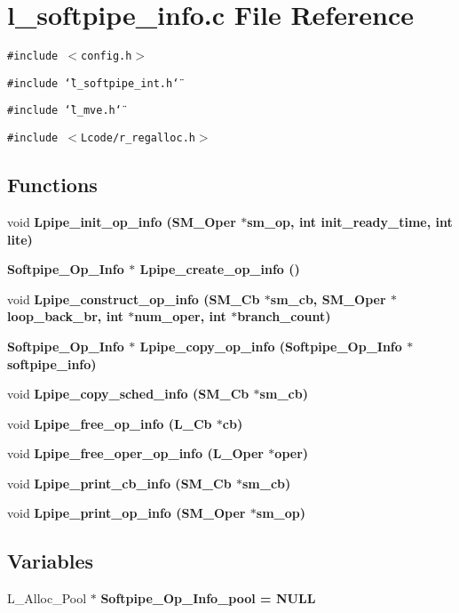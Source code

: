 \section{l\_\-softpipe\_\-info.c File Reference}
\label{l__softpipe__info_8c}
{\tt \#include $<$config.h$>$}\par
{\tt \#include \char`\"{}l\_\-softpipe\_\-int.h\char`\"{}}\par
{\tt \#include \char`\"{}l\_\-mve.h\char`\"{}}\par
{\tt \#include $<$Lcode/r\_\-regalloc.h$>$}\par
\subsection*{Functions}
\begin{CompactItemize}
\item 
void \bf{Lpipe\_\-init\_\-op\_\-info} (\bf{SM\_\-Oper} $\ast$sm\_\-op, int init\_\-ready\_\-time, int lite)
\item 
\bf{Softpipe\_\-Op\_\-Info} $\ast$ \bf{Lpipe\_\-create\_\-op\_\-info} ()
\item 
void \bf{Lpipe\_\-construct\_\-op\_\-info} (\bf{SM\_\-Cb} $\ast$sm\_\-cb, \bf{SM\_\-Oper} $\ast$loop\_\-back\_\-br, int $\ast$num\_\-oper, int $\ast$branch\_\-count)
\item 
\bf{Softpipe\_\-Op\_\-Info} $\ast$ \bf{Lpipe\_\-copy\_\-op\_\-info} (\bf{Softpipe\_\-Op\_\-Info} $\ast$softpipe\_\-info)
\item 
void \bf{Lpipe\_\-copy\_\-sched\_\-info} (\bf{SM\_\-Cb} $\ast$sm\_\-cb)
\item 
void \bf{Lpipe\_\-free\_\-op\_\-info} (L\_\-Cb $\ast$cb)
\item 
void \bf{Lpipe\_\-free\_\-oper\_\-op\_\-info} (L\_\-Oper $\ast$oper)
\item 
void \bf{Lpipe\_\-print\_\-cb\_\-info} (\bf{SM\_\-Cb} $\ast$sm\_\-cb)
\item 
void \bf{Lpipe\_\-print\_\-op\_\-info} (\bf{SM\_\-Oper} $\ast$sm\_\-op)
\end{CompactItemize}
\subsection*{Variables}
\begin{CompactItemize}
\item 
L\_\-Alloc\_\-Pool $\ast$ \bf{Softpipe\_\-Op\_\-Info\_\-pool} = NULL
\end{CompactItemize}


